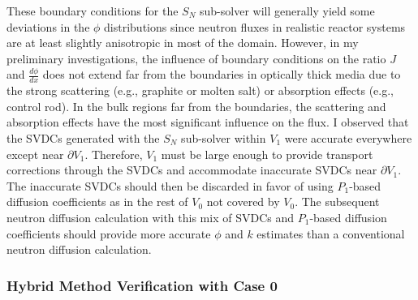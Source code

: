 %
These boundary conditions for the $S_N$ sub-solver will generally yield some deviations in the
$\phi$ distributions since neutron fluxes in realistic reactor systems are at least slightly
anisotropic in most of the domain. However, in my preliminary investigations, the influence of
boundary conditions on the ratio $J$ and $\frac{d\phi}{dx}$ does not extend far from the boundaries
in optically thick media due to the strong scattering (e.g., graphite or molten salt) or
absorption effects (e.g., control rod). In the bulk regions far from the boundaries, the
scattering and absorption effects have the most significant influence on the flux. I observed that
the \glspl{SVDC} generated with the $S_N$ sub-solver within $V_1$ were accurate everywhere except
near $\partial V_1$. Therefore, $V_1$ must be large enough to provide transport corrections
through the \glspl{SVDC} and accommodate inaccurate \glspl{SVDC} near
$\partial V_1$. The inaccurate \glspl{SVDC} should then be discarded in favor of using
$P_1$-based diffusion coefficients as in the rest of $V_0$ not covered by $V_0$. The
subsequent neutron diffusion calculation with this mix of \glspl{SVDC} and $P_1$-based diffusion
coefficients should provide more accurate $\phi$ and $k$ estimates than a conventional
neutron diffusion calculation.


\subsubsection{Hybrid Method Verification with Case 0}

